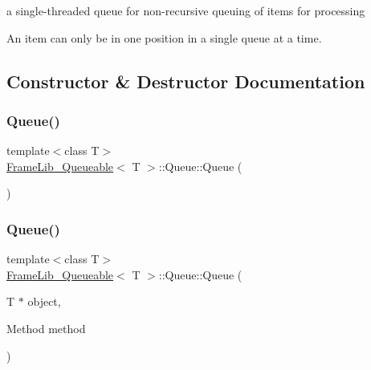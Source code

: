 a single-\/threaded queue for non-\/recursive queuing of items for processing 

An item can only be in one position in a single queue at a time. 

\subsection{Constructor \& Destructor Documentation}
\mbox{\label{class_frame_lib___queueable_1_1_queue_a5eb25b5751d5cc25331aa5e1b4fcb6ae}} 
\subsubsection{\texorpdfstring{Queue()}{Queue()}\hspace{0.1cm}{\footnotesize\ttfamily [1/3]}}
{\footnotesize\ttfamily template$<$class T$>$ \\
\hyperlink{class_frame_lib___queueable}{Frame\+Lib\+\_\+\+Queueable}$<$ T $>$\+::Queue\+::\+Queue (\begin{DoxyParamCaption}{ }\end{DoxyParamCaption})\hspace{0.3cm}{\ttfamily [inline]}}

\mbox{\label{class_frame_lib___queueable_1_1_queue_af701d261343c894ba4cde0aa8dd99bd1}} 
\subsubsection{\texorpdfstring{Queue()}{Queue()}\hspace{0.1cm}{\footnotesize\ttfamily [2/3]}}
{\footnotesize\ttfamily template$<$class T$>$ \\
\hyperlink{class_frame_lib___queueable}{Frame\+Lib\+\_\+\+Queueable}$<$ T $>$\+::Queue\+::\+Queue (\begin{DoxyParamCaption}\item[{T $\ast$}]{object,  }\item[{Method}]{method }\end{DoxyParamCaption})\hspace{0.3cm}{\ttfamily [inline]}}


